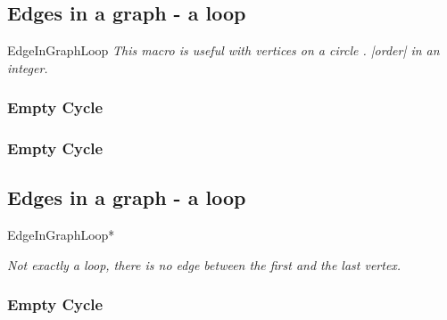\vfill
\newpage
\subsection{Edges in a graph - a loop }%
\begin{NewMacroBox}{EdgeInGraphLoop}{}
\emph{This macro is useful with vertices on a circle . |order| in an integer.}
\end{NewMacroBox}


\subsubsection{Empty Cycle}
\begin{center}
  \begin{tkzexample}
  \end{tkzexample}
\end{center}

\subsubsection{Empty Cycle}
\begin{center}
\begin{tkzexample}
\end{tkzexample}
\end{center}

\newpage
\subsection{Edges in a graph - a loop }
\begin{NewMacroBox}{EdgeInGraphLoop*}{}

\medskip
\emph{Not exactly a loop, there is no edge between the first and the last vertex.}
\end{NewMacroBox}

\subsubsection{Empty Cycle}
\begin{center}
\begin{tkzexample}
\end{tkzexample}
\end{center}

